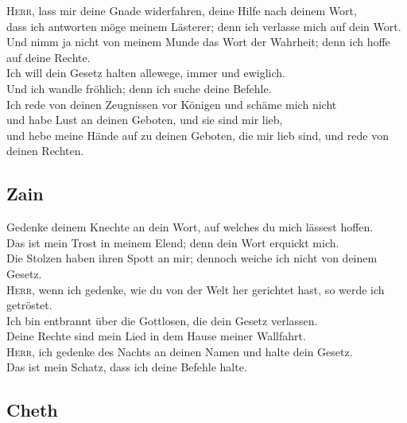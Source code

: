  \textsc{Herr}, lass mir deine Gnade widerfahren, deine
Hilfe nach deinem Wort,\\
 dass ich antworten möge meinem Lästerer; denn ich
verlasse mich auf dein Wort.\\
 Und nimm ja nicht von meinem Munde das Wort der
Wahrheit; denn ich hoffe auf deine Rechte.\\
 Ich will dein Gesetz halten allewege, immer und
ewiglich.\\
 Und ich wandle fröhlich; denn ich suche deine Befehle.\\
 Ich rede von deinen Zeugnissen vor Königen und schäme
mich nicht\\
 und habe Lust an deinen Geboten, und sie sind mir
lieb,\\
 und hebe meine Hände auf zu deinen Geboten, die mir lieb
sind, und rede von deinen Rechten.

\hypertarget{zain}{%
\subsection{Zain}\label{zain}}

 Gedenke deinem Knechte an dein Wort, auf welches du mich
lässest hoffen.\\
 Das ist mein Trost in meinem Elend; denn dein Wort
erquickt mich.\\
 Die Stolzen haben ihren Spott an mir; dennoch weiche ich
nicht von deinem Gesetz.\\
 \textsc{Herr}, wenn ich gedenke, wie du von der Welt her
gerichtet hast, so werde ich getröstet.\\
 Ich bin entbrannt über die Gottlosen, die dein Gesetz
verlassen.\\
 Deine Rechte sind mein Lied in dem Hause meiner
Wallfahrt.\\
 \textsc{Herr}, ich gedenke des Nachts an deinen Namen
und halte dein Gesetz.\\
 Das ist mein Schatz, dass ich deine Befehle halte.

\hypertarget{cheth}{%
\subsection{Cheth}\label{cheth}}

